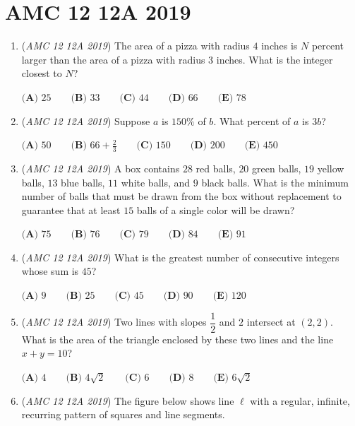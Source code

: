 \section{AMC 12 12A 2019}
        \begin{enumerate}
        	\item (\textit{AMC 12 12A 2019}) The area of a pizza with radius $4$ inches is $N$ percent larger than the area of a pizza with radius $3$ inches. What is the integer closest to $N$?


 $\textbf{(A) } 25 \qquad\textbf{(B) } 33 \qquad\textbf{(C) } 44\qquad\textbf{(D) } 66 \qquad\textbf{(E) } 78$


	\item (\textit{AMC 12 12A 2019}) Suppose $a$ is $150\%$ of $b$. What percent of $a$ is $3b$?


 $\textbf{(A) } 50 \qquad \textbf{(B) } 66+\frac{2}{3} \qquad \textbf{(C) } 150 \qquad \textbf{(D) } 200 \qquad \textbf{(E) } 450$


	\item (\textit{AMC 12 12A 2019}) A box contains $28$ red balls, $20$ green balls, $19$ yellow balls, $13$ blue balls, $11$ white balls, and $9$ black balls. What is the minimum number of balls that must be drawn from the box without replacement to guarantee that at least $15$ balls of a single color will be drawn?


 $\textbf{(A) } 75 \qquad\textbf{(B) } 76 \qquad\textbf{(C) } 79 \qquad\textbf{(D) } 84 \qquad\textbf{(E) } 91$


	\item (\textit{AMC 12 12A 2019}) What is the greatest number of consecutive integers whose sum is $45$?


 $\textbf{(A) } 9 \qquad\textbf{(B) } 25 \qquad\textbf{(C) } 45 \qquad\textbf{(D) } 90 \qquad\textbf{(E) } 120$


	\item (\textit{AMC 12 12A 2019}) Two lines with slopes $\dfrac{1}{2}$ and $2$ intersect at $(2,2)$. What is the area of the triangle enclosed by these two lines and the line $x+y=10$?


 $\textbf{(A) } 4 \qquad\textbf{(B) } 4\sqrt{2} \qquad\textbf{(C) } 6 \qquad\textbf{(D) } 8 \qquad\textbf{(E) } 6\sqrt{2}$


	\item (\textit{AMC 12 12A 2019}) The figure below shows line $\ell$ with a regular, infinite, recurring pattern of squares and line segments.



\end{enumerate}
